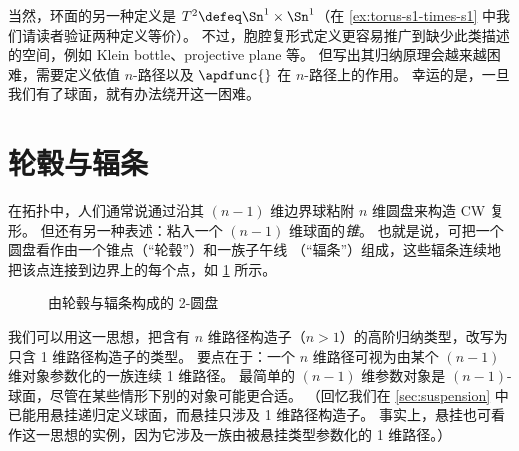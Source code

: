 当然，环面的另一种定义是 $T^2 \defeq \Sn^1 \times \Sn^1$（在 \cref{ex:torus-s1-times-s1} 中我们请读者验证两种定义等价）。
%
%
不过，胞腔复形式定义更容易推广到缺少此类描述的空间，例如 Klein bottle、projective plane 等。
但写出其归纳原理会越来越困难，需要定义依值 $n$-路径以及 $\apdfunc{}$ 在 $n$-路径上的作用。
幸运的是，一旦我们有了球面，就有办法绕开这一困难。

\section{轮毂与辐条}
\label{sec:hubs-spokes}

%
%

在拓扑中，人们通常说通过沿其 $(n-1)$ 维边界球粘附 $n$ 维圆盘来构造 CW 复形。
%
但还有另一种表述：粘入一个 $(n-1)$ 维球面的\emph{锥}。
也就是说，可把一个圆盘看作由一个锥点（“轮毂”）和一族子午线
%
（“辐条”）组成，这些辐条连续地把该点连接到边界上的每个点，如 \cref{fig:hub-and-spokes} 所示。

\begin{figure}
  \centering
  \caption{由轮毂与辐条构成的 2-圆盘}
  \label{fig:hub-and-spokes}
\end{figure}

我们可以用这一思想，把含有 $n$ 维路径构造子（$n>1$）的高阶归纳类型，改写为只含 1 维路径构造子的类型。
要点在于：一个 $n$ 维路径可视为由某个 $(n-1)$ 维对象参数化的一族连续 1 维路径。
最简单的 $(n-1)$ 维参数对象是 $(n-1)$-球面，尽管在某些情形下别的对象可能更合适。
（回忆我们在 \cref{sec:suspension} 中已能用悬挂递归定义球面，而悬挂只涉及 1 维路径构造子。
事实上，悬挂也可看作这一思想的实例，因为它涉及一族由被悬挂类型参数化的 1 维路径。）

